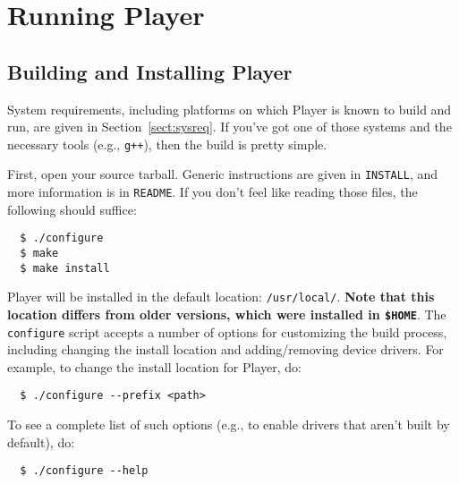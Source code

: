 \documentclass[11pt]{report}
\begin{document}
\chapter{Running Player}
\label{chapt:running}
\section{Building and Installing Player}
System requirements, including platforms on which Player is known to build and
run, are given in Section~\ref{sect:sysreq}.  If you've got one of those
systems and the necessary tools (e.g., {\tt g++}), then the build is
pretty simple.

First, open your source tarball.  Generic instructions are given in 
{\tt INSTALL}, and more information is in {\tt README}.  If you don't feel
like reading those files, the following should suffice:
\begin{verbatim}
  $ ./configure
  $ make
  $ make install
\end{verbatim} %
Player will be installed in the default location: {\tt /usr/local/}.
{\bf Note that this location differs from older versions, which were
installed in {\tt \$HOME}}.  The {\tt configure} script accepts a number
of options for customizing the build process, including changing the
install location and adding/removing device drivers.  For example,
to change the install location for Player, do:
\begin{verbatim}
  $ ./configure --prefix <path>
\end{verbatim} %
To see a complete list of such options (e.g., to enable drivers that
aren't built by default), do:
\begin{verbatim}
  $ ./configure --help
\end{verbatim} %
\end{document}
